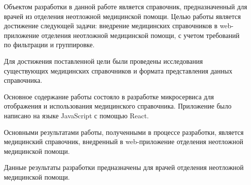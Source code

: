 \abstract %


Объектом разработки в данной работе является справочник, предназначенный для врачей из отделения неотложной медицинской помощи.
Целью работы является достижение следующей задачи: внедрение медицинских справочников в web-приложение отделения неотложной медицинской помощи, с учетом требований по фильтрации и группировке. 

Для достижения поставленной цели были проведены исследования существующих медицинских справочников и формата представления данных справочника. 

Основное содержание работы состояло в разработке микросервиса для отображения и использования медицинского справочника. Приложение было написано на языке JavaScript с помощью React. 

Основными результатами работы, полученными в процессе разработки, является медицинский справочник, внедренный в web-приложение отделения неотложной медицинской помощи.

Данные результаты разработки предназначены для врачей отделения неотложной медицинской помощи.